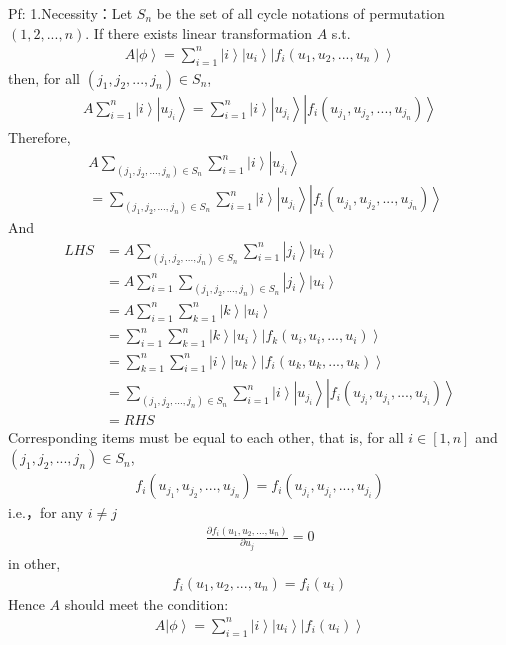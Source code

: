 \documentclass[%
 reprint,
 amsmath,amssymb,
pra,
]{revtex4-1}
\begin{document}
\noindent Pf: 1.Necessity：Let $S_n$ be the set of all cycle notations of permutation $\left(1, 2, ..., n\right)$. If there exists linear transformation $A$ s.t. 
\begin{align*}
	A\left|\phi\right\rangle = \sum_{i=1}^n \left|i\right\rangle\left|u_i\right\rangle\left|f_{i}\left(u_1, u_2, ..., u_n\right)\right\rangle
\end{align*}
then, for all $\left(j_1, j_2, ..., j_n\right)\in S_n$, 
\begin{align*}
	A\sum_{i=1}^n \left|i\right\rangle\left|u_{j_i}\right\rangle = \sum_{i=1}^n \left|i\right\rangle\left|u_{j_i}\right\rangle\left|f_{i}\left(u_{j_1}, u_{j_2}, ..., u_{j_n}\right)\right\rangle
\end{align*}
Therefore,  
\begin{align*}
	&A\sum_{\left(j_1, j_2, ..., j_n\right)\in S_n}\sum_{i=1}^n \left|i\right\rangle\left|u_{j_i}\right\rangle \\
	&=\sum_{\left(j_1, j_2, ..., j_n\right)\in S_n}\sum_{i=1}^n\left|i\right\rangle\left|u_{j_i}\right\rangle\left|f_{i}\left(u_{j_1}, u_{j_2}, ..., u_{j_n}\right)\right\rangle
\end{align*}
And
\begin{align*}
	LHS &= A\sum_{\left(j_1, j_2, ..., j_n\right)\in S_n}\sum_{i=1}^n \left|j_i\right\rangle\left|u_i\right\rangle\\
	&= A\sum_{i=1}^n\sum_{\left(j_1, j_2, ..., j_n\right)\in S_n}\left|j_i\right\rangle\left|u_i\right\rangle\\
	&= A\sum_{i=1}^n\sum_{k=1}^n\left|k\right\rangle\left|u_i\right\rangle \\
	&= \sum_{i=1}^n\sum_{k=1}^n\left|k\right\rangle\left|u_i\right\rangle\left|f_{k}\left(u_i, u_i, ..., u_i\right)\right\rangle\\
	&= \sum_{k=1}^n\sum_{i=1}^n\left|i\right\rangle\left|u_k\right\rangle\left|f_{i}\left(u_k, u_k, ..., u_k\right)\right\rangle \\
	&= \sum_{\left(j_1, j_2, ..., j_n\right)\in S_n}\sum_{i=1}^n\left|i\right\rangle\left|u_{j_i}\right\rangle\left|f_{i}\left(u_{j_i}, u_{j_i}, ..., u_{j_i}\right)\right\rangle\\
	&= RHS
\end{align*}
Corresponding items must be equal to each other, that is, for all $i \in \left[1, n\right]$ and $\left(j_1, j_2, ..., j_n\right)\in S_n$, 
\begin{align*}
	f_{i}\left(u_{j_1}, u_{j_2}, ..., u_{j_n}\right) = f_{i}\left(u_{j_i}, u_{j_i}, ..., u_{j_i}\right)
\end{align*}
i.e.，for any $i\neq j$
\begin{align*}
	\frac{\partial f_i\left(u_1, u_2, ..., u_n\right)}{\partial u_j} = 0
\end{align*}
in other, 
\begin{align*}
	f_i\left(u_1, u_2, ...,u_n\right) = f_i\left(u_i\right)
\end{align*}
Hence $A$ should meet the condition: 
\begin{align*}
	A\left|\phi\right\rangle = \sum_{i=1}^n \left|i\right\rangle\left|u_i\right\rangle\left|f_{i}\left(u_i\right)\right\rangle
\end{align*}
\end{document}
